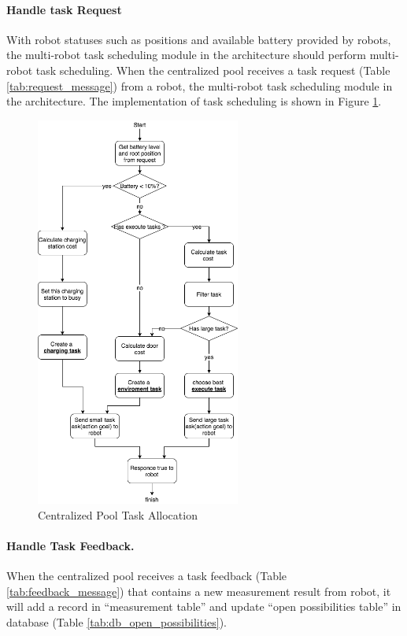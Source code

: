 \paragraph{Handle task Request}
With robot statuses such as positions and available battery provided by robots, the multi-robot task scheduling module in the architecture should perform multi-robot task scheduling. 
When the centralized pool receives a task request (Table \ref{tab:request_message}) from a robot, the multi-robot task scheduling module in the architecture. The implementation of task scheduling is shown in Figure \ref{fig:centralized_task_scheduling}. 

\begin{figure}
 \centering
 \includegraphics[width = 0.6\textwidth]{content/images/ch4/centralized_task_select.drawio.png}
 \caption{Centralized Pool Task Allocation}
 \label{fig:centralized_task_scheduling}
\end{figure}

\paragraph{Handle Task Feedback.}
When the centralized pool receives a task feedback (Table \ref{tab:feedback_message}) that contains a new measurement result from robot, it will add a record in ``measurement table'' and update ``open possibilities table'' in database (Table \ref{tab:db_open_possibilities}).

